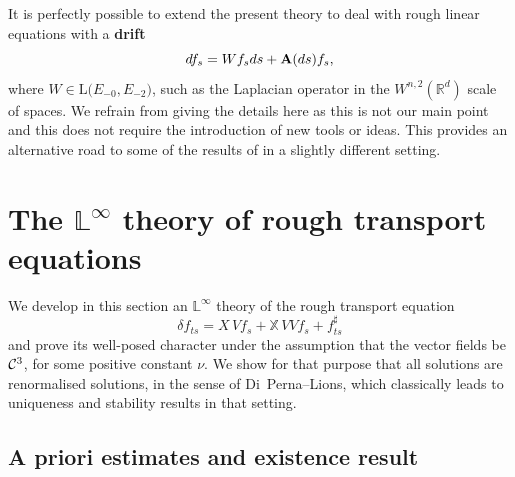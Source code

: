 \documentclass[11pt,a4paper]{amsart}
\newcommand{\RR}{\mathbb{R}}  \newcommand{\CC}{\mathbb{C}}  \newcommand{\LL}{\mathbb{L}}  \newcommand{\WW}{\mathbb{W}}
\newcommand{\bbX}{\mathbb{X}}
\numberwithin{equation}{section} %
\begin{document}
\medskip

It is perfectly possible to extend the present theory to deal with rough linear equations with a {\bf drift}
$$
df_s = Wf_s ds + {\bf A}(ds)f_s,
$$
where $W\in\textrm{L}\big(E_{-0},E_{-2}\big)$, such as the Laplacian operator in the $W^{n,2}(\RR^d)$ scale of spaces. We refrain from giving the details here as this is not our main point and this does not require the introduction of new tools or ideas. This provides an alternative road to some of the results of \cite{DiehlFrizStannat} in a slightly different setting.


\bigskip
 

\section{The $\LL^\infty$ theory of rough transport equations}
\label{SectionLInftyTheory}

We develop in this section an $\LL^\infty$ theory of the rough transport equation 
\begin{equation}
\label{EqTransportEq}
\delta f_{ts} = X\,Vf_s +  \bbX\,V V f_s + f^\sharp_{ts}
\end{equation}  
and prove its well-posed character under the assumption that the vector fields be $\mathcal{C}^3$, for some positive constant $\nu$. We show for that purpose that all solutions are renormalised solutions, in the sense of Di~Perna--Lions, which classically leads to uniqueness and stability results in that setting. 

\medskip

\subsection{A priori estimates and existence result}
\label{SubsectionAPrioriEstimatesLInfty}
\end{document}
